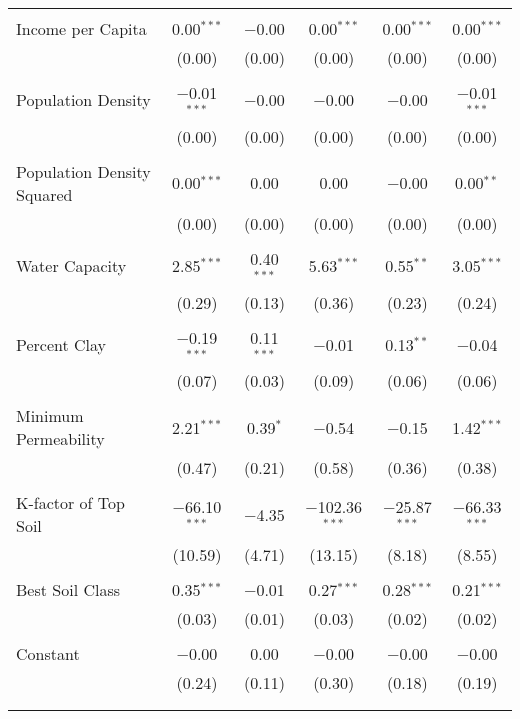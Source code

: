 \documentclass[10pt]{article}
\begin{document}
\begin{table}[!htbp]
\begin{tabular}{@{\extracolsep{5pt}}lccccc}
  & & & & & \\ 
 Income per Capita & 0.00$^{***}$ & $-$0.00 & 0.00$^{***}$ & 0.00$^{***}$ & 0.00$^{***}$ \\ 
  & (0.00) & (0.00) & (0.00) & (0.00) & (0.00) \\ 
  & & & & & \\ 
 Population Density & $-$0.01$^{***}$ & $-$0.00 & $-$0.00 & $-$0.00 & $-$0.01$^{***}$ \\ 
  & (0.00) & (0.00) & (0.00) & (0.00) & (0.00) \\ 
  & & & & & \\ 
 Population Density Squared & 0.00$^{***}$ & 0.00 & 0.00 & $-$0.00 & 0.00$^{**}$ \\ 
  & (0.00) & (0.00) & (0.00) & (0.00) & (0.00) \\ 
  & & & & & \\ 
 Water Capacity & 2.85$^{***}$ & 0.40$^{***}$ & 5.63$^{***}$ & 0.55$^{**}$ & 3.05$^{***}$ \\ 
  & (0.29) & (0.13) & (0.36) & (0.23) & (0.24) \\ 
  & & & & & \\ 
 Percent Clay & $-$0.19$^{***}$ & 0.11$^{***}$ & $-$0.01 & 0.13$^{**}$ & $-$0.04 \\ 
  & (0.07) & (0.03) & (0.09) & (0.06) & (0.06) \\ 
  & & & & & \\ 
 Minimum Permeability & 2.21$^{***}$ & 0.39$^{*}$ & $-$0.54 & $-$0.15 & 1.42$^{***}$ \\ 
  & (0.47) & (0.21) & (0.58) & (0.36) & (0.38) \\ 
  & & & & & \\ 
 K-factor of Top Soil & $-$66.10$^{***}$ & $-$4.35 & $-$102.36$^{***}$ & $-$25.87$^{***}$ & $-$66.33$^{***}$ \\ 
  & (10.59) & (4.71) & (13.15) & (8.18) & (8.55) \\ 
  & & & & & \\ 
 Best Soil Class & 0.35$^{***}$ & $-$0.01 & 0.27$^{***}$ & 0.28$^{***}$ & 0.21$^{***}$ \\ 
  & (0.03) & (0.01) & (0.03) & (0.02) & (0.02) \\ 
  & & & & & \\ 
 Constant & $-$0.00 & 0.00 & $-$0.00 & $-$0.00 & $-$0.00 \\ 
  & (0.24) & (0.11) & (0.30) & (0.18) & (0.19) \\ 
  & & & & & \\ 
\hline \\[-1.8ex] 

\end{tabular}
\end{table}
\end{document}
